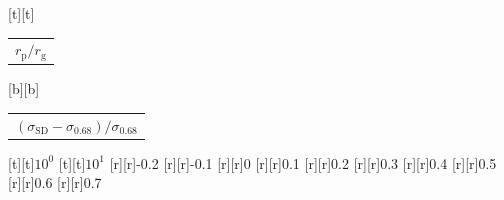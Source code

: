 %    
%
%
\begin{psfrags}%
\psfragscanon%
%
[t][t]{\color[rgb]{0,0,0}\setlength{\tabcolsep}{0pt}\begin{tabular}{c}{\Large$r_\mathrm{p}/r_\mathrm{g}$}\end{tabular}}%
[b][b]{\color[rgb]{0,0,0}\setlength{\tabcolsep}{0pt}\begin{tabular}{c}{\Large$(\sigma_\mathrm{SD}-\sigma_{0.68})/\sigma_{0.68}$}\end{tabular}}%
%
[t][t]{$10^{0}$}%
[t][t]{$10^{1}$}%
%
[r][r]{-0.2}%
[r][r]{-0.1}%
[r][r]{0}%
[r][r]{0.1}%
[r][r]{0.2}%
[r][r]{0.3}%
[r][r]{0.4}%
[r][r]{0.5}%
[r][r]{0.6}%
[r][r]{0.7}%
%
%
\end{psfrags}%
%
